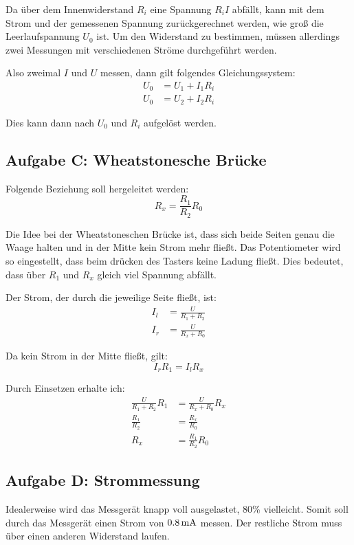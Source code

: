 \documentclass[11pt, ngerman]{article}
\begin{document}
Da über dem Innenwiderstand $R_i$ eine Spannung $R_i I$ abfällt, kann mit dem
Strom und der gemessenen Spannung zurückgerechnet werden, wie groß die
Leerlaufspannung $U_0$ ist. Um den Widerstand zu bestimmen, müssen allerdings
zwei Messungen mit verschiedenen Ströme durchgeführt werden.

Also zweimal $I$ und $U$ messen, dann gilt folgendes Gleichungssystem:
\begin{align*}
	U_0 &= U_1 + I_1 R_i \\
	U_0 &= U_2 + I_2 R_i
\end{align*}

Dies kann dann nach $U_0$ und $R_i$ aufgelöst werden.

\subsection{Aufgabe C: Wheatstonesche Brücke}

Folgende Beziehung soll hergeleitet werden:
\[ R_x = \frac{R_1}{R_2} R_0 \]

Die Idee bei der Wheatstoneschen Brücke ist, dass sich beide Seiten
genau die Waage halten und in der Mitte kein Strom mehr fließt. Das
Potentiometer wird so eingestellt, dass beim drücken des Tasters keine
Ladung fließt. Dies bedeutet, dass über $R_1$ und $R_x$ gleich viel
Spannung abfällt.

Der Strom, der durch die jeweilige Seite fließt, ist:
\begin{align*}
	I_l &= \frac U{R_1 + R_2} \\
	I_r &= \frac U{R_x + R_0}
\end{align*}

Da kein Strom in der Mitte fließt, gilt:
\[ I_r R_1 = I_l R_x \]

Durch Einsetzen erhalte ich:
\begin{align*}
	\frac U{R_1 + R_2} R_1 &= \frac U{R_x + R_0} R_x \\
	\frac {R_1}{R_2}  &= \frac {R_x}{R_0} \\
	R_x &= \frac {R_1}{R_2} R_0
\end{align*}

\subsection{Aufgabe D: Strommessung}

Idealerweise wird das Messgerät knapp voll ausgelastet, 80\% vielleicht.  Somit
soll durch das Messgerät einen Strom von $\unit[0.8]{mA}$ messen. Der restliche
Strom muss über einen anderen Widerstand laufen.
\end{document}
